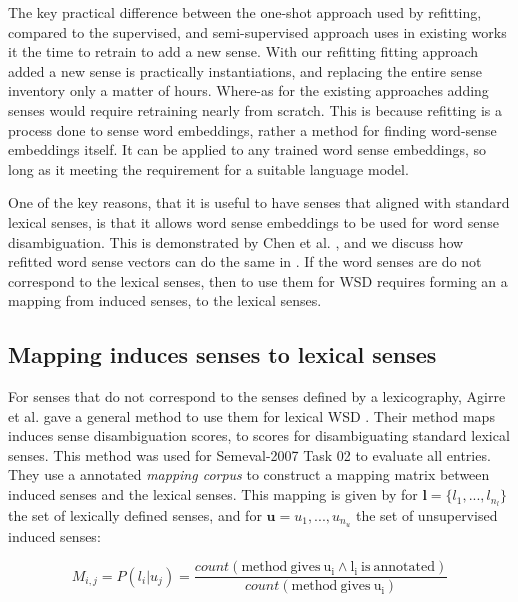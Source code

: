 \documentclass{sig-alternate}
\renewcommand{\l}{\mathbf{l}}
\renewcommand{\u}{\mathbf{u}}
\begin{document}
The key practical difference between the one-shot approach used by refitting, compared to the supervised, and semi-supervised approach uses in existing works it the time to retrain to add a new sense. With our refitting fitting approach added a new sense is practically instantiations, and replacing the entire sense inventory only a matter of hours. Where-as for the existing approaches adding senses would require retraining nearly from scratch. This is because refitting is a process done to sense word embeddings, rather a method for finding word-sense embeddings itself. It can be applied to any trained word sense embeddings, so long as it meeting the requirement for a suitable language model.

One of the key reasons, that it is useful to have senses that aligned with standard lexical senses, is that it allows word sense embeddings to be used for word sense disambiguation. This is demonstrated by Chen et al.  \parencite{Chen2014}, and we discuss how refitted word sense vectors can do the same in . If the word senses are do not correspond to the lexical senses, then to use them for WSD requires forming an a mapping from induced senses, to the lexical senses.

\subsection{Mapping induces senses to lexical senses}
For senses that do not correspond to the senses defined by a lexicography,  Agirre et al. gave a general method to use them for lexical WSD \parencite{agirre2006}.
Their method maps induces sense disambiguation scores, to scores for disambiguating standard lexical senses. This method was used for Semeval-2007 Task 02 \parencite{SemEval2007WSIandWSD} to evaluate all entries.
They use a annotated \emph{mapping corpus} to construct a mapping matrix between induced senses and the lexical senses.
This mapping is given by for $\l=\{l_1,..., l_{n_l}\}$ the set of lexically defined senses, and for $\u={u_1,...,u_{n_u}}$ the set of unsupervised induced senses:

\begin{equation} \label{eq:agirremap}
M_{i,j} = P(l_i | u_j) = \frac{count(\mathrm{method\: gives\: u_i \wedge l_i\: is\: annotated})}{count(\mathrm{method\: gives\: u_i})}
\end{equation}
\end{document}
